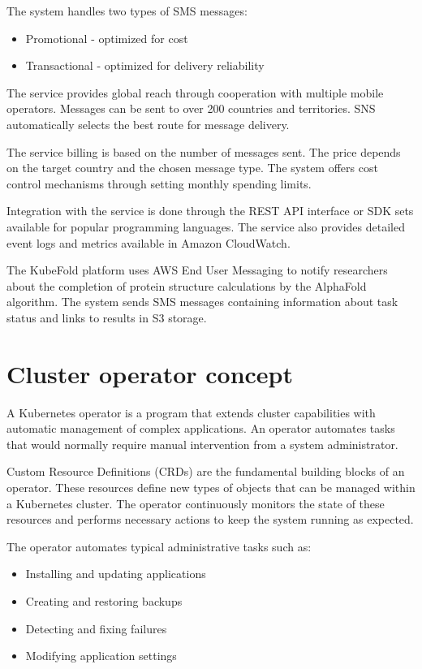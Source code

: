 The system handles two types of SMS messages:
\begin{itemize}
    \item Promotional - optimized for cost
    \item Transactional - optimized for delivery reliability
\end{itemize}

The service provides global reach through cooperation with multiple mobile operators.
Messages can be sent to over 200 countries and territories.
SNS automatically selects the best route for message delivery.

The service billing is based on the number of messages sent.
The price depends on the target country and the chosen message type.
The system offers cost control mechanisms through setting monthly spending limits.

Integration with the service is done through the REST API interface or SDK sets available for popular programming languages.
The service also provides detailed event logs and metrics available in Amazon CloudWatch.

The KubeFold platform uses AWS End User Messaging to notify researchers about the completion of protein structure calculations by the AlphaFold algorithm.
The system sends SMS messages containing information about task status and links to results in S3 storage.


\section{Cluster operator concept}

A Kubernetes operator is a program that extends cluster capabilities with automatic management of complex applications.
An operator automates tasks that would normally require manual intervention from a system administrator.

Custom Resource Definitions (CRDs) are the fundamental building blocks of an operator.
These resources define new types of objects that can be managed within a Kubernetes cluster.
The operator continuously monitors the state of these resources and performs necessary actions to keep the system running as expected.

The operator automates typical administrative tasks such as:
\begin{itemize}
    \item Installing and updating applications
    \item Creating and restoring backups
    \item Detecting and fixing failures
    \item Modifying application settings
\end{itemize}

